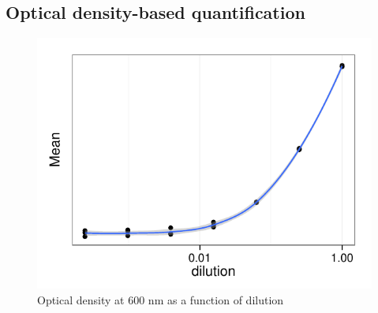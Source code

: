 \documentclass{article}\usepackage[]{graphicx}\usepackage[]{color}
\makeatletter
\def\maxwidth{ %
  \ifdim\Gin@nat@width>\linewidth
    \linewidth
  \else
    \Gin@nat@width
  \fi
}
\newenvironment{knitrout}{}{} %
\makeatother
\begin{document}
\subsection{Optical density-based quantification}
\begin{knitrout}
\color{fgcolor}\begin{figure}[]


{\centering \includegraphics[width=\maxwidth]{figure/odplot} 

}

\caption[Optical density at 600 nm as a function of dilution]{Optical density at 600 nm as a function of dilution\label{fig:odplot}}
\end{figure}


\end{knitrout}
\end{document}
